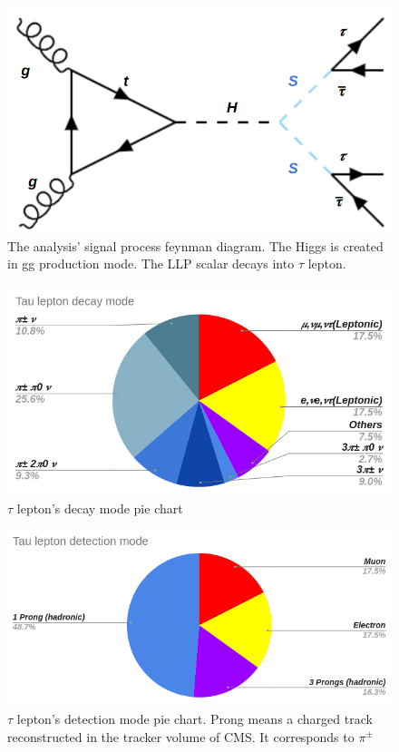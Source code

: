 \begin{figure}[h!]
  \caption{The analysis' signal process feynman diagram. The Higgs is created in gg production mode. The LLP scalar decays into $\tau$ lepton.}
  \label{fig:sig}
  \centering
  \includegraphics[width=0.47\linewidth]{figs/sigprocess.png}
\end{figure}


\begin{figure}[h!]
  \caption{$\tau$ lepton's decay mode pie chart}
  \label{fig:tdecay}
  \centering
  \includegraphics[width=0.87\linewidth]{figs/Taudec.png}
\end{figure}

\begin{figure}[h!]
	\caption{$\tau$ lepton's detection mode pie chart. Prong means a charged track reconstructed in the tracker volume of CMS. It corresponds to $\pi^{\pm}$}
  \label{fig:tdet}
  \centering
  \includegraphics[width=0.87\linewidth]{figs/Taudet.png}
\end{figure}


